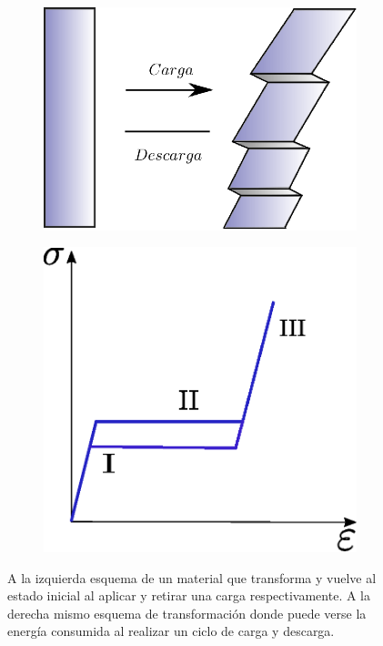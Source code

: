 \documentclass[a4paper,12pt,fleqn,twoside,openany]{book}
\begin{document}
 
 \begin{figure}[h]
 \centering
    \begin{subfigure}{0.49\textwidth}
        \includegraphics[width=\textwidth]{Img/Introduccion/HisteresisEsquema.eps}
        \caption{}
        \label{fig:EspCu}
    \end{subfigure}
    \begin{subfigure}{0.45\textwidth}
        \includegraphics[width=\textwidth]{Img/Introduccion/Histeresis.eps}
        \caption{}
        \label{fig:EspA}
    \end{subfigure}

  \label{fig: proceso}
  \caption{A la izquierda esquema de un material que transforma y vuelve al estado inicial al aplicar y retirar una carga respectivamente.
  A la derecha mismo esquema de transformación donde puede verse la energía consumida al realizar un ciclo de carga y descarga.}
\end{figure}
 
\end{document}
